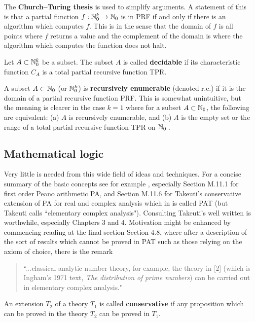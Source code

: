 \documentclass[12pt]{article}
\begin{document}
The {\bf Church--Turing thesis} is used to simplify arguments. A statement of this is that a partial function $f:\mathbb{N}_0^k\rightarrow\mathbb{N}_0$ is in PRF if and only if there is an algorithm which computes $f$. This is in the sense that the domain of $f$ is all points where $f$ returns a value and the complement of the domain is where the algorithm which computes the function does not halt.\par

 Let $A\subset \mathbb{N}_0^k$ be a subset. The subset $A$ is called {\bf decidable} if its characteristic function $C_A$ is a total partial recursive function TPR.

A subset $A\subset \mathbb{N}_0$ (or $\mathbb{N}_0^k$) is {\bf recursively enumerable} (denoted r.e.) if it is the domain of a partial recursive function PRF. This is somewhat unintuitive, but the meaning is clearer in the case $k=1$ where
for a subset $A\subset \mathbb{N}_0$, the following are equivalent: (a) $A$ is recursively enumerable, and
(b) $A$ is the empty set or the range of a total partial recursive function TPR on $\mathbb{N}_0$ \cite[Theorem N.4]{bro}.
\bigskip

\subsection{Mathematical logic}

Very little is needed from this wide field of ideas and techniques. For a concise summary of the basic concepts see for example \cite[Appendix M]{bro}, especially Section M.11.1 for first order Peano arithmetic PA, and Section M.11.6 for Takeuti's conservative extension of PA for real and complex analysis which in \cite{bro} is called PAT (but Takeuti calls ``elementary complex analysis"). Consulting Takeuti's well written \cite{tak} is worthwhile, especially Chapters 3 and 4. Motivation might be enhanced by commencing reading at the final section Section 4.8, where after a description of the sort of results which cannot be proved in PAT such as those relying on the axiom of choice, there is the remark
\begin{quote}
``...classical analytic number theory, for example, the theory in [2] (which is Ingham's 1971 text, {\it The distribution of prime numbers}) can be carried out in elementary complex analysis."
\end{quote}

An extension $T_2$ of a theory $T_1$ is called {\bf conservative} if any proposition which can be proved in the theory
$T_2$ can be proved in $T_1$.\par
\end{document}
